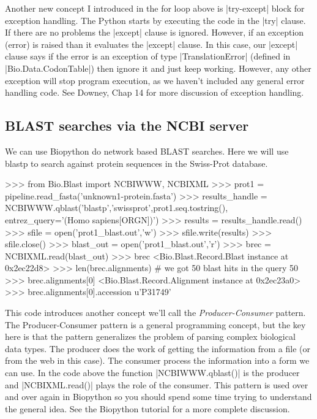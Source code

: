 Another new concept I introduced in the for loop above is |try-except| block for exception handling.  The Python starts by executing the code in the |try| clause.  If there are no problems the |except| clause is ignored.  However, if an exception (error) is raised than it evaluates the |except| clause. In this case, our |except| clause says if the error is an exception of type |TranslationError| (defined in |Bio.Data.CodonTable|) then ignore it and just keep working.  However, any other exception will stop program execution, as we haven't included any general error handling code. See Downey, Chap 14 for more discussion of exception handling.


\subsection{BLAST searches via the NCBI server}

We can use Biopython do network based BLAST searches. Here we will use blastp to search against protein sequences in the Swiss-Prot database.

\begin{python}
>>> from Bio.Blast import NCBIWWW, NCBIXML
>>> prot1 = pipeline.read_fasta('unknown1-protein.fasta')
>>> results_handle = NCBIWWW.qblast('blastp','swissprot',prot1.seq.tostring(), entrez_query='(Homo sapiens[ORGN])')
>>> results = results_handle.read()
>>> sfile = open('prot1_blast.out','w')
>>> sfile.write(results)
>>> sfile.close()
>>> blast_out = open('prot1_blast.out','r')
>>> brec = NCBIXML.read(blast_out)
>>> brec
<Bio.Blast.Record.Blast instance at 0x2ec22d8>
>>> len(brec.alignments) # we got 50 blast hits in the query
50
>>> brec.alignments[0]
<Bio.Blast.Record.Alignment instance at 0x2ec23a0>
>>> brec.alignments[0].accession
u'P31749'
\end{python}

This code introduces another concept we'll call the \emph{Producer-Consumer} pattern. The Producer-Consumer pattern is a general programming concept, but the key here is that the pattern generalizes the problem of parsing complex biological data types. The producer does the work of getting the information from a file (or from the web in this case). The consumer process the information into a form we can use. In the code above the function |NCBIWWW.qblast()| is the producer and |NCBIXML.read()| plays the role of the consumer. This pattern is used over and over again in Biopython so you should spend some time trying to understand the general idea. See the Biopython tutorial for a more complete discussion.

